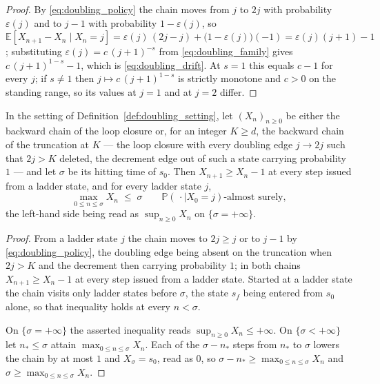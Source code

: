 \begin{proof}
By \eqref{eq:doubling_policy} the chain moves from $j$ to $2j$ with probability
$\varepsilon(j)$ and to $j-1$ with probability $1-\varepsilon(j)$, so
$\mathbb E\left[X_{n+1}-X_n\mid X_n=j\right]=\varepsilon(j)\,(2j-j)+\bigl(1-\varepsilon(j)\bigr)(-1)=\varepsilon(j)(j+1)-1$;
substituting $\varepsilon(j)=c\,(j+1)^{-s}$ from \eqref{eq:doubling_family} gives
$c\,(j+1)^{1-s}-1$, which is \eqref{eq:doubling_drift}. At $s=1$ this equals $c-1$ for every
$j$; if $s\neq1$ then $j\mapsto c\,(j+1)^{1-s}$ is strictly monotone and $c>0$ on the standing
range, so its values at $j=1$ and at $j=2$ differ.
\end{proof}

\begin{lemma}\label{lem:doubling_excursion}
In the setting of Definition~\ref{def:doubling_setting}, let $(X_n)_{n\geq0}$ be either the
backward chain of the loop closure or, for an integer $K\geq d$, the backward chain of the
truncation at $K$ --- the loop closure with every doubling edge $j\rightarrow2j$ such that
$2j>K$ deleted, the decrement edge out of such a state carrying probability $1$ --- and let
$\sigma$ be its hitting time of $s_0$. Then $X_{n+1}\geq X_n-1$ at every step issued from a
ladder state, and for every ladder state $j$,
\begin{equation}\label{eq:doubling_excursion}
    \max_{0\leq n\leq\sigma}X_n\;\leq\;\sigma\qquad\mathbb P(\,\cdot\mid X_0=j)\text{-almost surely},
\end{equation}
the left-hand side being read as $\sup_{n\geq0}X_n$ on $\{\sigma=+\infty\}$.
\end{lemma}

\begin{proof}
From a ladder state $j$ the chain moves to $2j\geq j$ or to $j-1$ by
\eqref{eq:doubling_policy}, the doubling edge being absent on the truncation when $2j>K$ and
the decrement then carrying probability $1$; in both chains $X_{n+1}\geq X_n-1$ at every step
issued from a ladder state. Started at a ladder state the chain visits only ladder states
before $\sigma$, the state $s_f$ being entered from $s_0$ alone, so that inequality holds at
every $n<\sigma$.

On $\{\sigma=+\infty\}$ the asserted inequality reads $\sup_{n\geq0}X_n\leq+\infty$. On
$\{\sigma<+\infty\}$ let $n_*\leq\sigma$ attain $\max_{0\leq n\leq\sigma}X_n$. Each of the
$\sigma-n_*$ steps from $n_*$ to $\sigma$ lowers the chain by at most $1$ and
$X_\sigma=s_0$, read as $0$, so $\sigma-n_*\geq\max_{0\leq n\leq\sigma}X_n$ and
$\sigma\geq\max_{0\leq n\leq\sigma}X_n$.
\end{proof}


